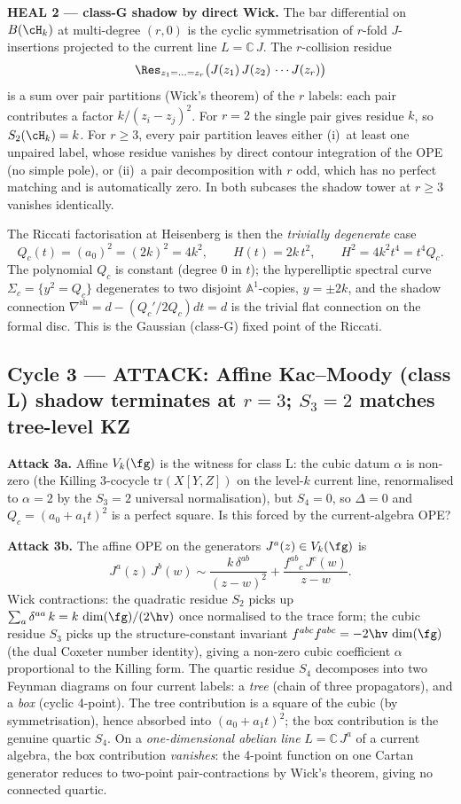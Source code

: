\textbf{HEAL 2 --- class-G shadow by direct Wick.} The bar differential
on $B(\cH_k)$ at multi-degree $(r, 0)$ is the cyclic symmetrisation of
$r$-fold $J$-insertions projected to the current line $L = \mathbb
C\,J$. The $r$-collision residue
\[
  \Res_{z_1 = \ldots = z_r}
  \bigl(J(z_1)\,J(z_2)\,\cdots J(z_r)\bigr)
\]
is a sum over pair partitions (Wick's theorem) of the $r$ labels:
each pair contributes a factor $k/(z_i - z_j)^2$. For $r = 2$ the
single pair gives residue $k$, so $S_2(\cH_k) = k$. For $r \ge 3$,
every pair partition leaves either (i)~at least one unpaired label,
whose residue vanishes by direct contour integration of the OPE (no
simple pole), or (ii)~a pair decomposition with $r$ odd, which has no
perfect matching and is automatically zero. In both subcases the
shadow tower at $r \ge 3$ vanishes identically.

The Riccati factorisation at Heisenberg is then the \emph{trivially
degenerate} case
\[
  Q_c(t) = (a_0)^2 = (2k)^2 = 4k^2,
  \qquad H(t) = 2k\,t^2,
  \qquad
  H^2 = 4k^2 t^4 = t^4 Q_c.
\]
The polynomial $Q_c$ is constant (degree $0$ in $t$); the hyperelliptic
spectral curve $\Sigma_c = \{y^2 = Q_c\}$ degenerates to two disjoint
$\mathbb A^1$-copies, $y = \pm 2k$, and the shadow connection
$\nabla^{\mathrm{sh}} = d - (Q_c'/2Q_c)dt = d$ is the trivial flat
connection on the formal disc. This is the Gaussian
(class-G) fixed point of the Riccati.

\subsection*{Cycle 3 --- ATTACK: Affine Kac--Moody (class L) shadow
terminates at $r = 3$; $S_3 = 2$ matches tree-level KZ}

\textbf{Attack 3a.} Affine $V_k(\fg)$ is the witness for class L: the
cubic datum $\alpha$ is non-zero (the Killing 3-cocycle
$\mathrm{tr}(X[Y,Z])$ on the level-$k$ current line, renormalised to
$\alpha = 2$ by the $S_3 = 2$ universal normalisation), but $S_4 = 0$,
so $\Delta = 0$ and $Q_c = (a_0 + a_1 t)^2$ is a perfect square. Is
this forced by the current-algebra OPE?

\textbf{Attack 3b.} The affine OPE on the generators
$J^a(z) \in V_k(\fg)$ is
\[
  J^a(z)\,J^b(w) \sim \frac{k\,\delta^{ab}}{(z-w)^2}
                     + \frac{f^{ab}{}_c\,J^c(w)}{z-w}.
\]
Wick contractions: the quadratic residue $S_2$ picks up
$\sum_a \delta^{aa}\,k = k\,\dim(\fg)/(2\hv)$ once normalised to the
trace form; the cubic residue $S_3$ picks up the structure-constant
invariant $f^{abc} f^{abc} = -2\hv\,\dim(\fg)$ (the dual Coxeter
number identity), giving a non-zero cubic coefficient $\alpha$
proportional to the Killing form. The quartic residue $S_4$
decomposes into two Feynman diagrams on four current labels: a
\emph{tree} (chain of three propagators), and a \emph{box} (cyclic
4-point). The tree contribution is a square of the cubic (by
symmetrisation), hence absorbed into $(a_0 + a_1 t)^2$; the box
contribution is the genuine quartic $S_4$. On a \emph{one-dimensional
abelian line} $L = \mathbb C\,J^a$ of a current algebra, the box
contribution \emph{vanishes}: the 4-point function on one Cartan
generator reduces to two-point pair-contractions by Wick's theorem,
giving no connected quartic.

